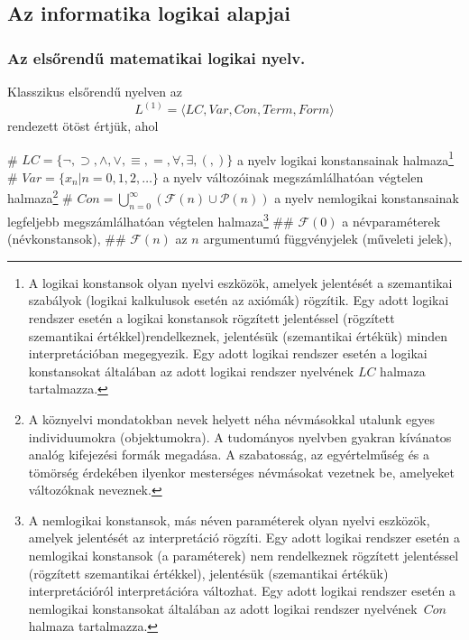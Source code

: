 \subsection{Az informatika logikai alapjai}
\def\InterpretOnNu{^{\langle U, \rho \rangle}_{\nu}}
\subsubsection{Az elsőrendű matematikai logikai nyelv.}
\begin{definition}
	Klasszikus elsőrendű nyelven az $$ L^{(1)} = \langle LC,Var,Con,Term,Form\rangle $$ rendezett ötöst értjük, ahol\\
	\begin{easylist}
	# $LC = \{\neg,\supset,\land,\lor,\equiv,=,\forall,\exists,(,)\}$ a nyelv logikai konstansainak halmaza\footnote{A logikai konstansok olyan nyelvi eszközök, amelyek jelentését a szemantikai szabályok (logikai kalkulusok esetén az axiómák) rögzítik. Egy adott logikai rendszer esetén a logikai konstansok rögzített jelentéssel (rögzített szemantikai értékkel)rendelkeznek, jelentésük (szemantikai értékük) minden interpretációban megegyezik. Egy adott logikai rendszer esetén a logikai konstansokat általában az adott logikai rendszer nyelvének $LC$	halmaza tartalmazza.}
	# $Var = \{x_{n}| n = 0,1,2,\dots\}$ a nyelv változóinak megszámlálhatóan végtelen halmaza\footnote{A köznyelvi mondatokban nevek helyett néha névmásokkal utalunk egyes individuumokra (objektumokra). A tudományos nyelvben gyakran kívánatos analóg kifejezési formák megadása. A szabatosság, az egyértelműség és a tömörség érdekében ilyenkor mesterséges névmásokat vezetnek be, amelyeket változóknak neveznek.}
	# $Con = \bigcup_{n=0}^\infty(\mathcal{F}(n)\cup\mathcal{P}(n))$ a nyelv nemlogikai konstansainak legfeljebb megszámlálhatóan végtelen halmaza\footnote{A nemlogikai konstansok, más néven paraméterek olyan nyelvi eszközök, amelyek jelentését az interpretáció rögzíti. Egy adott logikai rendszer esetén a nemlogikai konstansok (a paraméterek) nem rendelkeznek rögzített jelentéssel (rögzített szemantikai értékkel), jelentésük (szemantikai értékük) interpretációról interpretációra változhat. Egy adott logikai rendszer esetén a nemlogikai konstansokat általában az adott logikai rendszer nyelvének $Con$ halmaza tartalmazza.}
	## $\mathcal{F}(0)$ a névparaméterek (névkonstansok),
	## $\mathcal{F}(n)$ az $ n $ argumentumú függvényjelek (műveleti jelek),

\end{easylist}
\end{definition}
